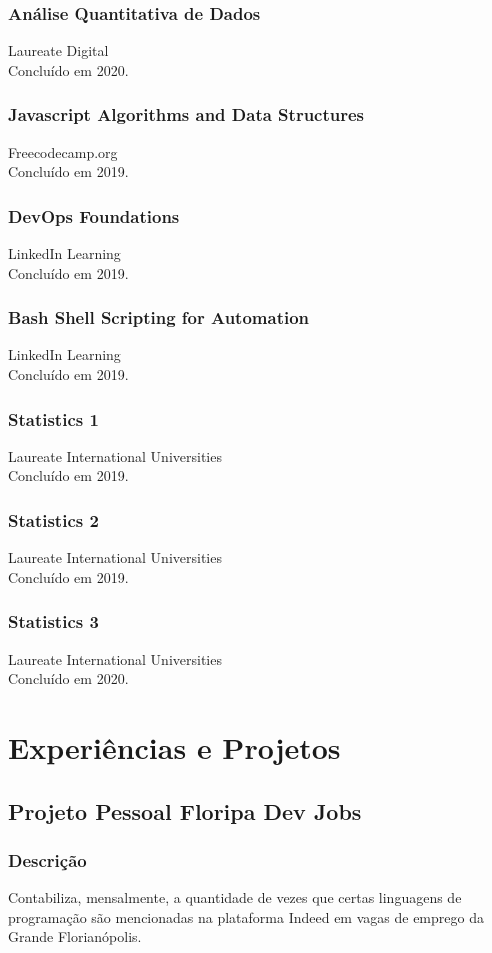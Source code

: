 \documentclass{article}
\begin{document}
\begin{multicols}{2}
\subsubsection{An\'alise Quantitativa de Dados}
Laureate Digital \\
Conclu\'ido em 2020.
\subsubsection{Javascript Algorithms and Data Structures}
Freecodecamp.org \\
Conclu\'ido em 2019.
\subsubsection{DevOps Foundations}
LinkedIn Learning \\
Conclu\'ido em 2019.
\subsubsection{Bash Shell Scripting for Automation}
LinkedIn Learning \\
Conclu\'ido em 2019.
\subsubsection{Statistics 1}
Laureate International Universities \\
Conclu\'ido em 2019.
\subsubsection{Statistics 2}
Laureate International Universities \\
Conclu\'ido em 2019.
\subsubsection{Statistics 3}
Laureate International Universities \\
Concluído em 2020.

\section{Experi\^encias e Projetos}
\subsection{Projeto Pessoal Floripa Dev Jobs}
\subsubsection{Descri\c{c}\~ao}
Contabiliza, mensalmente, a quantidade de vezes que certas linguagens de programação são mencionadas na plataforma Indeed em vagas de emprego da Grande Florianópolis.

\end{multicols}
\end{document}
